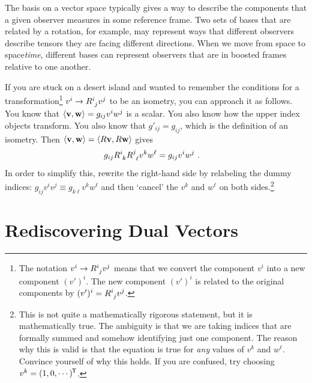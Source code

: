 \documentclass[12pt, oneside]{report}    %
\let\oldsection\section
\def\section{%
  \setcounter{sidenote}{1}%
  \oldsection
}
\begin{document}
\begin{bigidea}
The basis on a vector space typically gives a way to describe the components that a given observer measures in some reference frame. Two sets of bases that are related by a rotation, for example, may represent ways that different observers describe tensors they are facing different directions. When we move from space to space\emph{time}, different bases can represent observers that are in boosted frames relative to one another. 
\end{bigidea}


\begin{example}
If you are stuck on a desert island and wanted to remember the conditions for a transformation\footnote{The notation $v^i\to R\aij{i}{j}v^j$ means that we convert the component $v^i$ into a new component $(v')^i$. The new component $(v')^i$ is related to the original components by $(v')^i = R\aij{i}{j}v^j$. } $v^i \to R\aij{i}{j}v^j$ to be an isometry, you can approach it as follows. You know that $\langle \mathbf{v}, \mathbf{w}\rangle = g_{ij} v^i w^j$ is a scalar. You also know how the upper index objects transform. You also know that $g'_{ij}=g_{ij}$, which is the definition of an isometry. Then $\langle \mathbf{v}, \mathbf{w}\rangle  = \langle R\mathbf{v}, R\mathbf{w}\rangle $ gives
\begin{align}
    g_{ij}R\aij{i}{k} R\aij{j}{\ell} v^k w^\ell &= g_{ij} v^i w^j \ .
\end{align}
In order to simplify this, rewrite the right-hand side by relabeling the dummy indices: $g_{ij}v^i v^j \equiv g_{k\ell}v^k w^\ell$ and then `cancel' the $v^k$ and $w^\ell$ on both sides.\footnote{This is not quite a mathematically rigorous statement, but it is mathematically true. The ambiguity is that we are taking indices that are formally summed and somehow identifying just one component. The reason why this is valid is that the equation is true for \emph{any} values of $v^k$ and $w^\ell$. Convince yourself of why this holds. If you are confused, try choosing $v^k = (1,0, \cdots)^{\mkern-1.5mu\mathsf{T}}$.}
\end{example}
 
\section{Rediscovering Dual Vectors}
\end{document}
